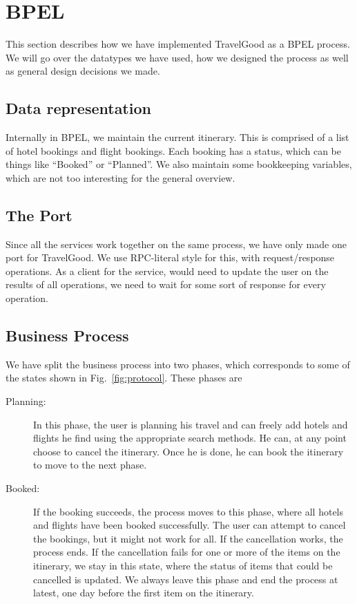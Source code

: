 \section{BPEL}
This section describes how we have implemented TravelGood as a BPEL process. We will go over the datatypes we have used, how we designed the process as well as general design decisions we made.

\subsection{Data representation}
Internally in BPEL, we maintain the current itinerary. This is comprised of a list of hotel bookings and flight bookings. Each booking has a status, which can be things like ``Booked'' or ``Planned''. We also maintain some bookkeeping variables, which are not too interesting for the general overview.

\subsection{The Port}
Since all the services work together on the same process, we have only made one port for TravelGood. We use RPC-literal style for this, with request/response operations. As a client for the service, would need to update the user on the results of all operations, we need to wait for some sort of response for every operation.

\subsection{Business Process}
We have split the business process into two phases, which corresponds to some of the states shown in Fig.~\ref{fig:protocol}. These phases are

\begin{description}
\item [Planning:] In this phase, the user is planning his travel and can freely add hotels and flights he find using the appropriate search methods. He can, at any point choose to cancel the itinerary. Once he is done, he can book the itinerary to move to the next phase.

\item[Booked:] If the booking succeeds, the process moves to this phase, where all hotels and flights have been booked successfully. The user can attempt to cancel the bookings, but it might not work for all. If the cancellation works, the process ends. If the cancellation fails for one or more of the items on the itinerary, we stay in this state, where the status of items that could be cancelled is updated. We always leave this phase and end the process at latest, one day before the first item on the itinerary.

\end{description}

